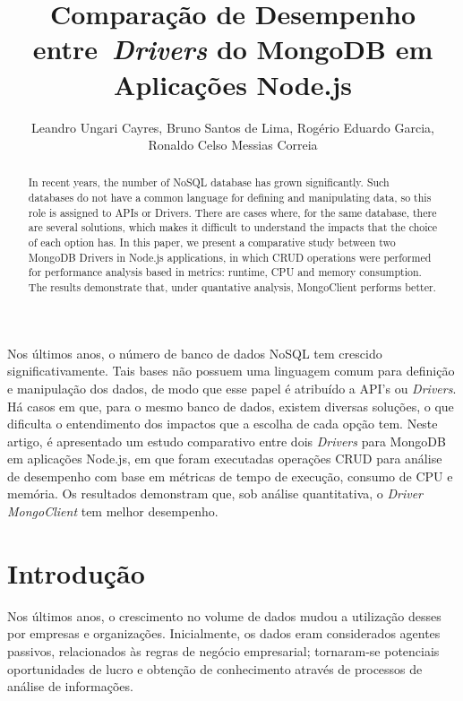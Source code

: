 \documentclass[12pt]{article}
\title{Comparação de Desempenho entre~\emph{Drivers} do MongoDB em Aplicações Node.js}
\author{Leandro Ungari Cayres, Bruno Santos de Lima, Rogério Eduardo Garcia,\\ Ronaldo Celso Messias Correia}
\begin{document}
 

\maketitle

\begin{abstract}
In recent years, the number of NoSQL database has grown significantly. Such databases do not have a common language for defining and manipulating data, so this role is assigned to APIs or Drivers. There are cases where, for the same database, there are several solutions, which makes it difficult to understand the impacts that the choice of each option has. In this paper, we present a comparative study between two MongoDB Drivers in Node.js applications, in which CRUD operations were performed for performance analysis based in metrics: runtime, CPU and memory consumption. The results demonstrate that, under quantative analysis, MongoClient performs better.
\end{abstract}
     
\begin{resumo} 
Nos últimos anos, o número de banco de dados NoSQL tem crescido significativamente. Tais bases não possuem uma linguagem comum para definição e manipulação dos dados, de modo que esse papel é atribuído a API's ou \emph{Drivers}. Há casos em que, para o mesmo banco de dados, existem diversas soluções, o que dificulta o entendimento dos impactos que a escolha de cada opção tem. Neste artigo, é apresentado um estudo comparativo entre dois \emph{Drivers} para MongoDB em aplicações Node.js, em que foram executadas operações CRUD para análise de desempenho com base em métricas de tempo de execução, consumo de CPU e memória. Os resultados demonstram que, sob análise quantitativa, o \emph{Driver} \emph{MongoClient} tem melhor desempenho.
\end{resumo}


\section{Introdução}
\label{sec:introducao}

Nos últimos anos, o crescimento no volume de dados mudou a utilização desses por empresas e organizações. Inicialmente, os dados eram considerados agentes passivos, relacionados às regras de negócio empresarial; tornaram-se potenciais oportunidades de lucro e obtenção de conhecimento através de processos de análise de informações.
\end{document}
